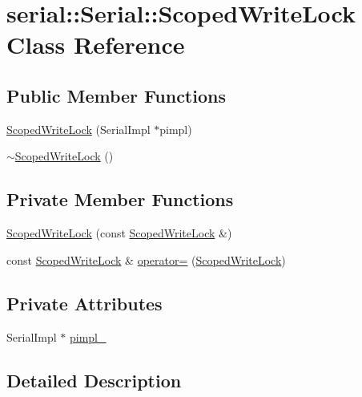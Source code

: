 \hypertarget{class_serial_1_1_scoped_write_lock}{}\section{serial\+:\+:Serial\+:\+:Scoped\+Write\+Lock Class Reference}
\label{class_serial_1_1_scoped_write_lock}
\subsection*{Public Member Functions}
\begin{DoxyCompactItemize}
\item 
\hyperlink{class_serial_1_1_scoped_write_lock_a662173968431aee3d6f204c354b20225}{Scoped\+Write\+Lock} (Serial\+Impl $\ast$pimpl)
\item 
\hyperlink{class_serial_1_1_scoped_write_lock_aebeef5b2d16f409b60094cfac092ada2}{$\sim$\+Scoped\+Write\+Lock} ()
\end{DoxyCompactItemize}
\subsection*{Private Member Functions}
\begin{DoxyCompactItemize}
\item 
\hyperlink{class_serial_1_1_scoped_write_lock_a12456e5d57c963e04b1a8503b3db5cf3}{Scoped\+Write\+Lock} (const \hyperlink{class_serial_1_1_scoped_write_lock}{Scoped\+Write\+Lock} \&)
\item 
const \hyperlink{class_serial_1_1_scoped_write_lock}{Scoped\+Write\+Lock} \& \hyperlink{class_serial_1_1_scoped_write_lock_a16ffd1b9e01afd3ceedcc51f29d76f28}{operator=} (\hyperlink{class_serial_1_1_scoped_write_lock}{Scoped\+Write\+Lock})
\end{DoxyCompactItemize}
\subsection*{Private Attributes}
\begin{DoxyCompactItemize}
\item 
Serial\+Impl $\ast$ \hyperlink{class_serial_1_1_scoped_write_lock_aa7d7430d81f824316afdc2338685ec34}{pimpl\+\_\+}
\end{DoxyCompactItemize}


\subsection{Detailed Description}


